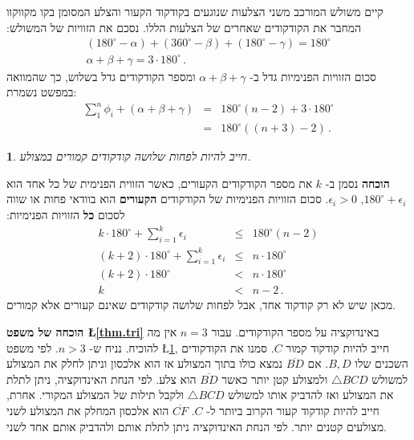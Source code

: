 \documentclass[12pt,a4paper]{article}
\newtheorem{theorem}{\R{משפט}}
\newenvironment{form}[1]{%
\begin{displaymath}%
\renewcommand{\arraystretch}{#1}%
\begin{array}{lcl}}%
{\end{array}%
\end{displaymath}%
}
\begin{document}
קיים משולש המורכב משני הצלעות שנוגעים בקודקוד הקעור והצלע המסומן בקו מקווקוו המחבר את הקודקודים שאחרים של הצלעות הללו. נסכם את הזוויות של המשולש:
\begin{form}{1.2}
(180^\circ - \alpha) + (360^\circ - \beta) + (180^\circ - \gamma) = 180^\circ\\
\alpha + \beta + \gamma = 3\cdot 180^\circ\,.
\end{form}
סכום הזוויות הפנימיות גדל ב-%
$\alpha+\beta+\gamma$
ומספר הקודקודים גדל בשלוש, כך שהמוואה במפשט נשמרת:
\begin{form}{1.4}
\displaystyle\sum_1^n \phi_i + (\alpha + \beta + \gamma) &=& 180^\circ(n-2)+3\cdot 180^\circ\\
&=& 180^\circ((n+3)-2)\,.
\end{form}
\begin{theorem}\label{thm.convex}
חייב להיות לפחות שלושה קודקודים קמורים במצולע.
\end{theorem}

\textbf{הוכחה}
נסמן ב-%
$k$
את מספר הקודקודים הקעורים, כאשר הזווית הפנימית של כל אחד הוא
$180^\circ+\epsilon_i$, $\epsilon_i>0$.
סכום הזוויות הפנימיות של הקודקודים
\textbf{הקעורים}
הוא בוודאי פחות או שווה לסכום
\textbf{כל}
הזוויות הפנימיות:
\begin{form}{1.4}
k\cdot 180^\circ +\displaystyle\sum_{i=1}^{k}\epsilon_i &\leq& 180^\circ(n-2)\\
(k+2)\cdot 180^\circ +\displaystyle\sum_{i=1}^{k}\epsilon_i &\leq& n\cdot 180^\circ\\
(k+2)\cdot 180^\circ &<& n\cdot 180^\circ\\
k&<&n-2\,.
\end{form}
מכאן שיש לא רק קודקוד אחד, אבל לפחות שלושה קודקודים שאינם קעורים אלא קמורים.

\textbf{הוכחה של משפט
\L{\ref{thm.tri}}}
באינדוקציה על מספר הקודקודים. עבור
$n=3$
אין מה להוכיח. נניח ש-%
$n>3$.
לפי משפט 
\L{\ref{thm.convex}},
חייב להיות קודקוד קמור
$C$.
סמנו את הקודקודים השכנים שלו
$B,D$.
אם
$\overline{BD}$
נמצא כולו בתוך המצולע אז הוא אלכסון וניתן לחלק את המצולע למשולש 
$\triangle BCD$
ולמצולע קטן יותר כאשר
$\overline{BD}$
הוא צלע. לפי הנחת האינדוקציה, ניתן לתלת את המצולע ואז להדביק אותו למשולש
$\triangle BCD$
ולקבל תילות של המצולע המקורי. אחרת, חייב להיות קודקוד קעור הקרוב ביותר ל-%
$C$.
$\overline{CF}$
הוא אלכסון המחלק את המצולע לשני מצולעים קטנים יותר. לפי הנחת האינדוקציה ניתן לתלת אותם ולהדביק אותם אחד לשני.
\begin{center}
\end{center}
\end{document}
